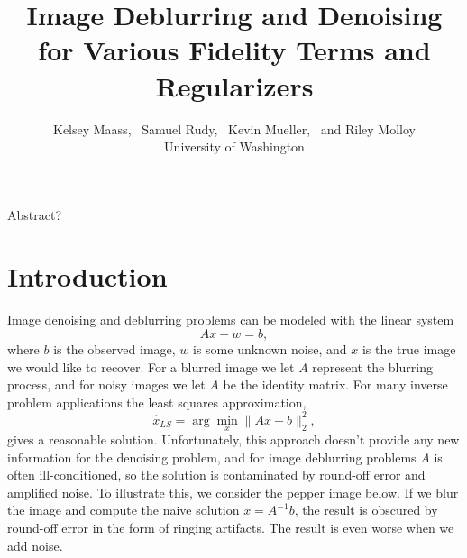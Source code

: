 \documentclass[10pt,a4paper]{article}
\begin{document}
\title{Image Deblurring and Denoising for Various Fidelity Terms and Regularizers}
\author{
Kelsey Maass, ~Samuel Rudy, ~Kevin Mueller, ~and Riley Molloy\\
University of Washington\\
}

\maketitle

Abstract?

\section{Introduction}

Image denoising and deblurring problems can be modeled with the linear system
\begin{equation}
Ax + w = b,
\end{equation}
where $b$ is the observed image, $w$ is some unknown noise, and $x$ is the true image we would like to recover. For a blurred image we let $A$ represent the blurring process, and for noisy images we let $A$ be the identity matrix. For many inverse problem applications the least squares approximation, 
\begin{equation}
\hat{x}_{LS} = \arg\min_x \| Ax - b \|_2^2 ,
\end{equation}
gives a reasonable solution. Unfortunately, this approach doesn't provide any new information for the denoising problem, and for image deblurring problems $A$ is often ill-conditioned, so the solution is contaminated by round-off error and amplified noise. To illustrate this, we consider the pepper image below. If we blur the image and compute the naive solution $x = A^{-1}b$, the result is obscured by round-off error in the form of ringing artifacts. The result is even worse when we add noise.
\end{document}
